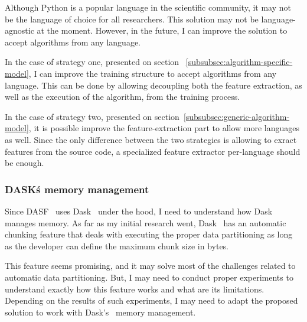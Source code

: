 Although Python is a popular language in the scientific community, it may not be the language of choice for all researchers.
This solution may not be language-agnostic at the moment.
However, in the future, I can improve the solution to accept algorithms from any language.

In the case of strategy one, presented on section ~\ref{subsubsec:algorithm-specific-model}, I can improve the training structure to accept algorithms from any language.
This can be done by allowing decoupling both the feature extraction, as well as the execution of the algorithm, from the training process.

In the case of strategy two, presented on section~\ref{subsubsec:generic-algorithm-model}, it is possible improve the feature-extraction part to allow more languages as well.
Since the only difference between the two strategies is allowing to exract features from the source code, a specialized feature extractor per-language should be enough.

\subsubsection{DASK\'s memory management}

Since \ac{DASF}~\cite{dasf} uses Dask~\cite{dask} under the hood, I need to understand how Dask~\cite{dask} manages memory.
As far as my initial research went, Dask~\cite{dask} has an automatic chunking feature that deals with executing the proper data partitioning as long as the developer can define the maximum chunk size in bytes.

This feature seems promising, and it may solve most of the challenges related to automatic data partitioning.
But, I may need to conduct proper experiments to understand exactly how this feature works and what are its limitations.
Depending on the results of such experiments, I may need to adapt the proposed solution to work with Dask's~\cite{dask} memory management.
